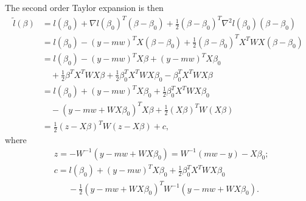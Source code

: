 \documentclass{jhwhw}
\begin{document}
\begin{enumerate}[label=(\Alph*)]
The second order Taylor expansion is then 
\begin{align*}
\tilde{l} (\beta) &= l (\beta_0) + \nabla l (\beta_0)^T (\beta - \beta_0) + \frac{1}{2} (\beta - \beta_0)^T \nabla^2 l (\beta_0) (\beta - \beta_0)
\\
&= l (\beta_0) - (y - m w)^T X (\beta - \beta_0) + \frac{1}{2} (\beta - \beta_0)^T X^T W X (\beta - \beta_0)
\\
&= l (\beta_0) - (y-mw)^T X \beta + (y - mw)^T X \beta_0 
\\
&\quad + \frac{1}{2} \beta^T X^T W X \beta + \frac{1}{2} \beta_0^T X^T W X \beta_0 - \beta_0^T X^T W X \beta
\\
&=l (\beta_0) + (y - mw)^T X \beta_0 + \frac{1}{2} \beta_0^T X^T W X \beta_0 
\\
&\quad - (y - mw + WX\beta_0)^T X \beta + \frac{1}{2} (X \beta)^T W (X \beta)
\\
&=\frac{1}{2} ( z - X \beta)^T W ( z - X \beta) + c,
\end{align*}
where 
\begin{align*}
&z = -W^{-1} (y - mw + WX \beta_0) = W^{-1}(mw - y) - X \beta_0;
\\
&c = l(\beta_0) + (y - mw)^T X \beta_0 + \frac{1}{2} \beta_0^T X^T W X \beta_0 
\\
&\quad \text{ } - \frac{1}{2} (y - mw + WX \beta_0)^T W^{-1} (y - mw + WX \beta_0).
\end{align*}


\end{enumerate}
\end{document}
